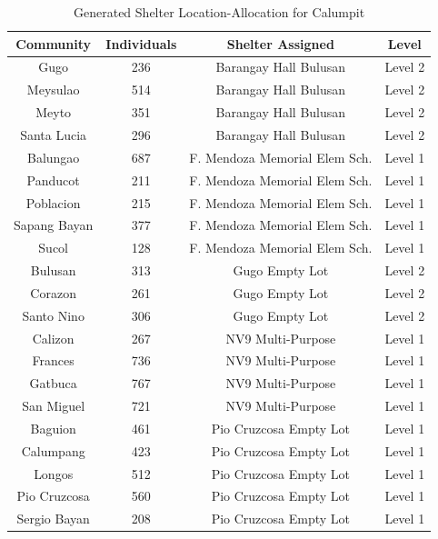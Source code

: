 	\begin{table}[h]
		\centering
		\caption{Generated Shelter Location-Allocation for Calumpit}
		\label{calReport}
		\begin{tabular}{|c|c|c|c|}
			\hline
			\textbf{Community} & \textbf{Individuals} & \textbf{Shelter Assigned} & \textbf{Level} \\ \hline
			Gugo & 236 & Barangay Hall Bulusan & Level 2 \\ \hline
			Meysulao & 514 & Barangay Hall Bulusan & Level 2 \\ \hline
			Meyto & 351 & Barangay Hall Bulusan & Level 2 \\ \hline
			Santa Lucia & 296 & Barangay Hall Bulusan & Level 2 \\ \hline
			
			Balungao & 687  & F. Mendoza Memorial Elem Sch. & Level 1 \\ \hline
			Panducot & 211 & F. Mendoza Memorial Elem Sch. & Level 1 \\ \hline
			Poblacion & 215 & F. Mendoza Memorial Elem Sch. & Level 1 \\ \hline
			Sapang Bayan & 377 & F. Mendoza Memorial Elem Sch. & Level 1 \\ \hline
			Sucol & 128  & F. Mendoza Memorial Elem Sch. & Level 1 \\ \hline
			
			Bulusan & 313 & Gugo Empty Lot & Level 2 \\ \hline
			Corazon & 261 & Gugo Empty Lot & Level 2 \\ \hline
			Santo Nino & 306 & Gugo Empty Lot & Level 2 \\ \hline
			
			Calizon & 267  & NV9 Multi-Purpose & Level 1 \\ \hline
			Frances & 736 & NV9 Multi-Purpose & Level 1 \\ \hline
			Gatbuca & 767 & NV9 Multi-Purpose & Level 1 \\ \hline
			San Miguel & 721 & NV9 Multi-Purpose & Level 1 \\ \hline
			
			Baguion & 461  & Pio Cruzcosa Empty Lot & Level 1 \\ \hline
			Calumpang & 423 & Pio Cruzcosa Empty Lot & Level 1 \\ \hline
			Longos & 512 & Pio Cruzcosa Empty Lot & Level 1 \\ \hline
			Pio Cruzcosa & 560 & Pio Cruzcosa Empty Lot & Level 1 \\ \hline
			Sergio Bayan & 208  & Pio Cruzcosa Empty Lot & Level 1 \\ \hline
			

\end{tabular}
\end{table}
